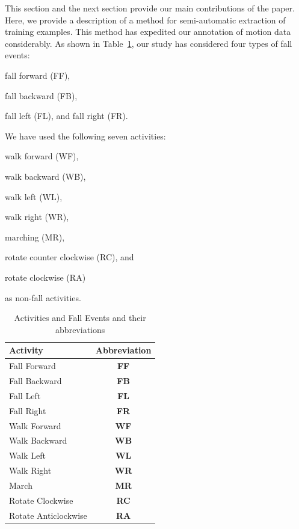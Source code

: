 \documentclass[]{IEEEtran}
\begin{document}
This section and the next section provide our main contributions of the paper. Here, we provide a description 
of a method for semi-automatic extraction of training examples. This method has expedited our 
annotation 
of motion data considerably. As shown in Table~\ref{Tbl:ListOfActivities},  our study has considered four types of fall events: 
\begin{inparaenum}[1)] \item fall forward ({\sf FF}), \item fall backward ({\sf FB}), 
\item fall left ({\sf FL}), and fall right ({\sf FR}). \end{inparaenum} We have used the 
following seven activities:\begin{inparaenum}[1)] \item walk forward ({\sf WF}), \item 
walk backward ({\sf WB}), \item walk left ({\sf WL}), \item walk right ({\sf WR}), \item 
marching ({\sf MR}), \item rotate counter clockwise ({\sf RC}), and \item rotate 
clockwise ({\sf RA})  \end{inparaenum} as non-fall activities. 

\begin{table}[htb]
\caption{Activities and Fall Events and their abbreviations}
\centering
{
\begin{tabular}{|l|c|}
\hline
\textbf{Activity} & \textbf{Abbreviation} \\  \hline
Fall Forward &\textbf{FF} \\ \hline
Fall Backward &\textbf{FB}  \\ \hline
Fall Left &\textbf{FL}  \\ \hline
Fall Right &\textbf{FR}  \\ \hline \hline
Walk Forward &\textbf{WF} \\ \hline
Walk Backward &\textbf{WB} \\ \hline
Walk Left &\textbf{WL} \\ \hline
Walk Right &\textbf{WR}  \\ \hline
March &\textbf{MR}  \\ \hline
Rotate Clockwise &\textbf{RC} \\ \hline
Rotate Anticlockwise&\textbf{RA}  \\ \hline
\end{tabular}
}
\label{Tbl:ListOfActivities}
\end{table}
\end{document}
